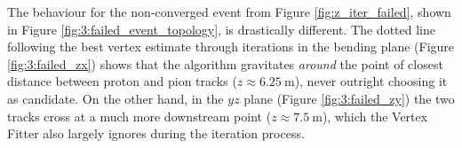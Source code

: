 The behaviour for the non-converged event from Figure \ref{fig:z_iter_failed}, shown in Figure \ref{fig:3:failed_event_topology}, is drastically different.
The dotted line following the best vertex estimate through iterations in the bending plane (Figure \ref{fig:3:failed_zx}) shows that the algorithm gravitates \textit{around} the point of closest distance between proton and pion tracks ($z \approx \SI{6.25}{\meter}$), never outright choosing it as candidate.
On the other hand, in the $yz$ plane (Figure \ref{fig:3:failed_zy}) the two tracks cross at a much more downstream point ($z \approx \SI{7.5}{\meter}$), which the Vertex Fitter also largely ignores during the iteration process.



